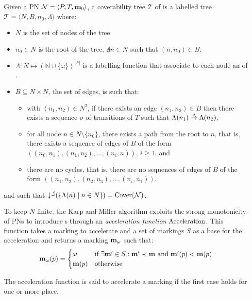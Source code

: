 \begin{defi}
  Given a \ac{PN} $\mathcal{N} = \langle P,T, \mathbf{m}_0\rangle$, a coverability tree $\mathcal{T}$ of \N is a labelled tree $\mathcal{T} = \langle N, B, n_0, \Lambda\rangle$ where:
  \begin{itemize}
    \item $N$ is the set of nodes of the tree.%
    \item $n_0 \in N$ is the root of the tree,  $\nexists n \in N$ such that $(n, n_0) \in B$.
    \item $\Lambda : N \mapsto (\mathbb{N} \cup \{\omega\})^{|P|}$ is a labelling function that associate to each node an \omark of \N.
    \item $B \subseteq N \times N$, the set of edges, is such that:
      \begin{itemize}
        \item with $(n_1, n_2) \in N^2$, if there exists an edge $(n_1, n_2) \in B$ then there exists a sequence $\sigma$ of transitions of $T$ such that $\Lambda(n_1) \stackrel{\sigma}{\to} \Lambda(n_2)$,
        \item for all node $n \in N \setminus \{n_0\}$, there exists a path from the root to $n$, that is, there exists a sequence of edges of $B$ of the form $((n_0, n_1), (n_1, n_2), \dots, (n_{i}, n))$, $i \geq 1$, and
        \item there are no cycles, that is, there are no sequences of edges of $B$ of the form $((n_1, n_2), (n_2, n_3), \dots, (n_i, n_1))$.
      \end{itemize}
  \end{itemize}
  and such that $\operatorname{\downarrow^\preceq}(\{\Lambda(n) \mid n \in N\}) = \operatorname{Cover}(\mathcal{N})$.
\end{defi}

To keep $N$ finite, the Karp and Miller algorithm exploits the strong monotonicity of \acp{PN} to introduce \omark{}s through an \emph{acceleration function} $\operatorname{Acceleration}$.
This function takes a marking \mar to accelerate and a set of markings $S$ as a base  for the acceleration and returns a marking $\mathbf{m}_\omega$ such that:
\[
  \mathbf{m}_\omega(p) =
  \begin{cases}
    \omega    &\text{if } \exists \mathbf{m'} \in S : \mathbf{m'} \prec \mathbf{m} \text{ and } \mathbf{m'}(p) < \mathbf{m}(p) \\
    \mathbf{m}(p)  &\text{otherwise}
  \end{cases}
\]

The acceleration function is said to accelerate a marking if the first case holds for one or more place.

